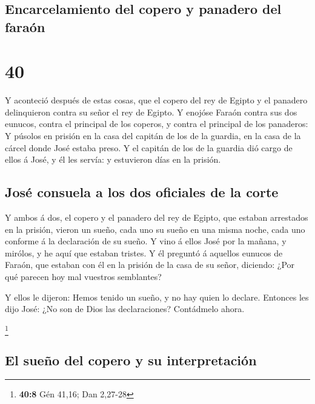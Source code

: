 \hypertarget{encarcelamiento-del-copero-y-panadero-del-farauxf3n}{%
\subsection{Encarcelamiento del copero y panadero del
faraón}\label{encarcelamiento-del-copero-y-panadero-del-farauxf3n}}

\hypertarget{section-39}{%
\section{40}\label{section-39}}

 Y aconteció después de estas cosas, que el copero del rey
de Egipto y el panadero delinquieron contra su señor el rey de Egipto.
 Y enojóse Faraón contra sus dos eunucos, contra el
principal de los coperos, y contra el principal de los panaderos:
 Y púsolos en prisión en la casa del capitán de los de la
guardia, en la casa de la cárcel donde José estaba preso. 
Y el capitán de los de la guardia dió cargo de ellos á José, y él les
servía: y estuvieron días en la prisión.

\hypertarget{josuxe9-consuela-a-los-dos-oficiales-de-la-corte}{%
\subsection{José consuela a los dos oficiales de la
corte}\label{josuxe9-consuela-a-los-dos-oficiales-de-la-corte}}

 Y ambos á dos, el copero y el panadero del rey de Egipto,
que estaban arrestados en la prisión, vieron un sueño, cada uno su sueño
en una misma noche, cada uno conforme á la declaración de su sueño.
 Y vino á ellos José por la mañana, y mirólos, y he aquí
que estaban tristes.  Y él preguntó á aquellos eunucos de
Faraón, que estaban con él en la prisión de la casa de su señor,
diciendo: ¿Por qué parecen hoy mal vuestros semblantes?

 Y ellos le dijeron: Hemos tenido un sueño, y no hay quien
lo declare. Entonces les dijo José: ¿No son de Dios las declaraciones?
Contádmelo ahora.

\footnote{\textbf{40:8} Gén 41,16; Dan 2,27-28}

\hypertarget{el-sueuxf1o-del-copero-y-su-interpretaciuxf3n}{%
\subsection{El sueño del copero y su
interpretación}\label{el-sueuxf1o-del-copero-y-su-interpretaciuxf3n}}

